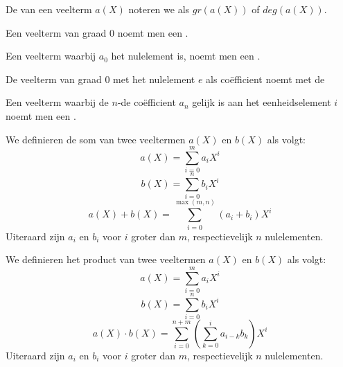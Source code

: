 \documentclass[main.tex]{subfiles}
\begin{document}
\begin{de}
  De  van een veelterm $a(X)$ noteren we als $gr(a(X))$ of $deg(a(X))$.
\end{de}

\begin{de}
  Een veelterm van graad $0$ noemt men een .
\end{de}

\begin{de}
  Een veelterm waarbij $a_{0}$ het nulelement is, noemt men een .
\end{de}

\begin{de}
  De veelterm van graad $0$ met het nulelement $e$ als co\"efficient noemt met de 
\end{de}

\begin{de}
  Een veelterm waarbij de $n$-de co\"efficient $a_{n}$ gelijk is aan het eenheidselement $i$ noemt men een .
\end{de}

\begin{de}
  We definieren de som van twee veeltermen $a(X)$ en $b(X)$ als volgt:
  \[ a(X) = \sum_{i=0}^{m}a_{i}X^{i} \]
  \[ b(X) = \sum_{i=0}^{n}b_{i}X^{i} \]
  \[  a(X) + b(X) = \sum_{i=0}^{\max(m,n)}(a_{i} + b_{i})X^{i} \]
  Uiteraard zijn $a_{i}$ en $b_{i}$ voor $i$ groter dan $m$, respectievelijk $n$ nulelementen.
\end{de}

\begin{de}
  We definieren het product van twee veeltermen $a(X)$ en $b(X)$ als volgt:
  \[ a(X) = \sum_{i=0}^{m}a_{i}X^{i} \]
  \[ b(X) = \sum_{i=0}^{n}b_{i}X^{i} \]
  \[  a(X)\cdot b(X) = \sum_{i=0}^{n+m}\left(\sum_{k=0}^{i}a_{i-k}b_{k}\right)X^{i} \]
  Uiteraard zijn $a_{i}$ en $b_{i}$ voor $i$ groter dan $m$, respectievelijk $n$ nulelementen.
\end{de}
\end{document}

